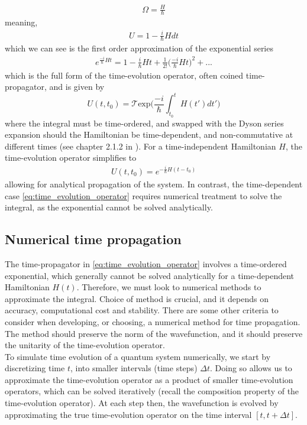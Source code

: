 \documentclass{subfiles}
\begin{document}
\begin{align*}
    \Omega = \frac{H}{\hbar}
\end{align*}
meaning, 
\begin{align*}
    U = 1 - \frac{i}{\hbar}Hdt
\end{align*}
which we can see is the first order approximation of the exponential series
\begin{align*}
    e^{\frac{-i}{\hbar}Ht} = 1 - \frac{i}{\hbar}Ht + \frac{1}{2!}\bigg(\frac{-i}{\hbar}Ht\bigg)^2 + ...
\end{align*}
which is the full form of the time-evolution operator, often coined time-propagator, and is given by
\begin{equation}
    U(t, t_0) = \mathcal{T}\text{exp}\bigg(\frac{-i}{\hbar}\int_{t_0}^t H(t')dt'\bigg)\label{eq:time_evolution_operator}
\end{equation}
where the integral must be time-ordered, and swapped with the Dyson series expansion should the Hamiltonian be time-dependent, and non-commutative at different times (see chapter 2.1.2 in \cite{sakurai1986modern}). For a time-independent Hamiltonian $H$, the time-evolution operator simplifies to 
\begin{align*}
    U(t, t_0) = e^{-\frac{i}{\hbar}H(t-t_0)}
\end{align*}
allowing for analytical propagation of the system. In contrast, the time-dependent case \eqref{eq:time_evolution_operator} requires numerical treatment to solve the integral, as the exponential cannot be solved analytically. 

\subsection{Numerical time propagation}
The time-propagator in \eqref{eq:time_evolution_operator} involves a time-ordered exponential, which generally cannot be solved analytically for a time-dependent Hamiltonian $H(t)$. Therefore, we must look to numerical methods to approximate the integral. Choice of method is crucial, and it depends on accuracy, computational cost and stability. There are some other criteria to consider when developing, or choosing, a numerical method for time propagation. The method should preserve the norm of the wavefunction, and it should preserve the unitarity of the time-evolution operator. 
\\

To simulate time evolution of a quantum system numerically, we start by discretizing time $t$, into smaller intervals (time steps) $\Delta t$. Doing so allows us to approximate the time-evolution operator as a product of smaller time-evolution operators, which can be solved iteratively (recall the composition property of the time-evolution operator). At each step then, the wavefunction is evolved by approximating the true time-evolution operator on the time interval $[t, t+\Delta t]$. \\ 
\end{document}
